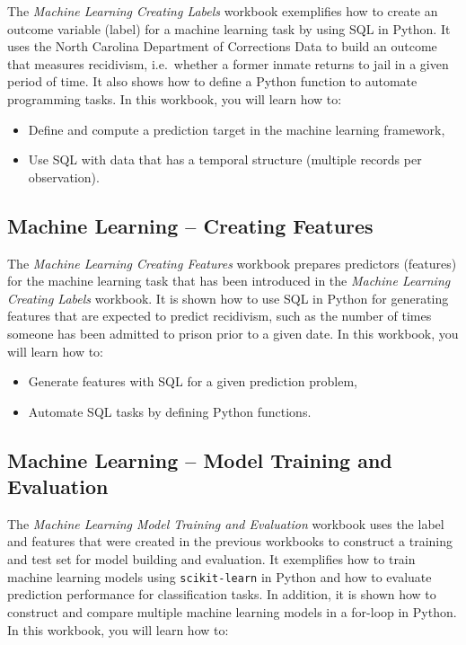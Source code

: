\documentclass[]{krantz}
\begin{document}
The \emph{Machine Learning Creating Labels} workbook exemplifies how to
create an outcome variable (label) for a machine learning task by using
SQL in Python. It uses the North Carolina Department of Corrections Data
to build an outcome that measures recidivism, i.e.~whether a former
inmate returns to jail in a given period of time. It also shows how to
define a Python function to automate programming tasks. In this
workbook, you will learn how to:

\begin{itemize}
\item
  Define and compute a prediction target in the machine learning
  framework,
\item
  Use SQL with data that has a temporal structure (multiple records per
  observation).
\end{itemize}

\subsection{Machine Learning -- Creating
Features}\label{machine-learning-creating-features}

The \emph{Machine Learning Creating Features} workbook prepares
predictors (features) for the machine learning task that has been
introduced in the \emph{Machine Learning Creating Labels} workbook. It
is shown how to use SQL in Python for generating features that are
expected to predict recidivism, such as the number of times someone has
been admitted to prison prior to a given date. In this workbook, you
will learn how to:

\begin{itemize}
\item
  Generate features with SQL for a given prediction problem,
\item
  Automate SQL tasks by defining Python functions.
\end{itemize}

\subsection{Machine Learning -- Model Training and
Evaluation}\label{machine-learning-model-training-and-evaluation}

The \emph{Machine Learning Model Training and Evaluation} workbook uses
the label and features that were created in the previous workbooks to
construct a training and test set for model building and evaluation. It
exemplifies how to train machine learning models using
\texttt{scikit-learn} in Python and how to evaluate prediction
performance for classification tasks. In addition, it is shown how to
construct and compare multiple machine learning models in a for-loop in
Python. In this workbook, you will learn how to:
\end{document}
